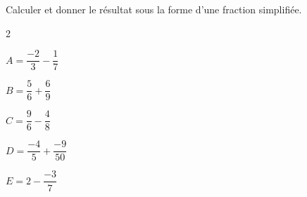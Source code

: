\begin{exercice*}
    Calculer et donner le résultat sous la forme d'une fraction simplifiée.
    \begin{multicols}2
        \begin{list}{}{}
            \begin{spacing}{2}
                \item $A = \dfrac{-2}{3}-\dfrac{1}{7}$
                \item $B = \dfrac{5}{6}+\dfrac{6}{9}$
                \item $C = \dfrac{9}{6}-\dfrac{4}{8}$
                \item $D = \dfrac{-4}{5}+\dfrac{-9}{50}$
                \item $E = 2-\dfrac{-3}{7}$
            \end{spacing}
        \end{list}
    \end{multicols}


\end{exercice*}
